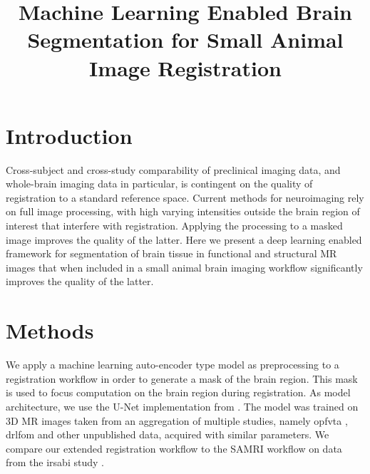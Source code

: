 \documentclass[11pt, english]{article}
\title{Machine Learning Enabled Brain Segmentation for Small Animal Image Registration}
\date{}
\begin{document}
    \maketitle


    \section{Introduction}
    Cross-subject and cross-study comparability of preclinical imaging data, and whole-brain imaging data in particular, is contingent on the quality of registration to a standard reference space.
    Current methods for neuroimaging rely on full image processing, with high varying intensities outside the brain region of interest that interfere with registration.
    Applying the processing to a masked image improves the quality of the latter.
    Here we present a deep learning enabled framework for segmentation of brain tissue in functional and structural MR images that when included in a small animal brain imaging workflow significantly improves the quality of the latter.


    \section{Methods}
    We apply a machine learning auto-encoder type model as preprocessing to a registration workflow in order to generate a mask of the brain region.
    This mask is used to focus computation on the brain region during registration.
    As model architecture, we use the U-Net \citep{ronneberger_u-net:_2015} implementation from \citet{oktay_ozan-oktayattention-gated-networks_2020}.
    The model was trained on 3D MR images taken from an aggregation of multiple studies, namely opfvta \citep{ioanas_whole-brain_nodate}, drlfom \citep{imperfect_datasets} and other unpublished data, acquired with similar parameters.
    We compare our extended registration workflow to the SAMRI workflow \citep{samri} on data from the irsabi study
    \citep{irsabi_bidsdata}.
\end{document}
